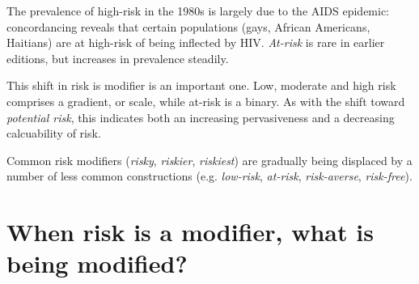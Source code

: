     The prevalence of high-risk in the 1980s is largely due to the AIDS epidemic: concordancing reveals that certain populations (gays, African Americans, Haitians) are at high-risk of being inflected by HIV. \emph{At-risk} is rare in earlier editions, but increases in prevalence steadily.

    This shift in risk is modifier is an important one. Low, moderate and high risk comprises a gradient, or scale, while at-risk is a binary. As with the shift toward \emph{potential risk}, this indicates both an increasing pervasiveness and a decreasing calcuability of risk. %
    




    \vspace{5mm}\noindent\begin{tcolorbox}[colback=yellow!5,colframe=yellow!40!black,title=Summary: frequencies of modifier risk]
    \parbox{1\textwidth}{%
    Common risk modifiers (\emph{risky}, \emph{riskier}, \emph{riskiest}) are gradually being displaced by a number of less common constructions (e.g. \emph{low-risk}, \emph{at-risk}, \emph{risk-averse}, \emph{risk-free}).}
    \end{tcolorbox}
    \vspace{5mm}

\section{When risk is a modifier, what is being modified?} \FloatBarrier

